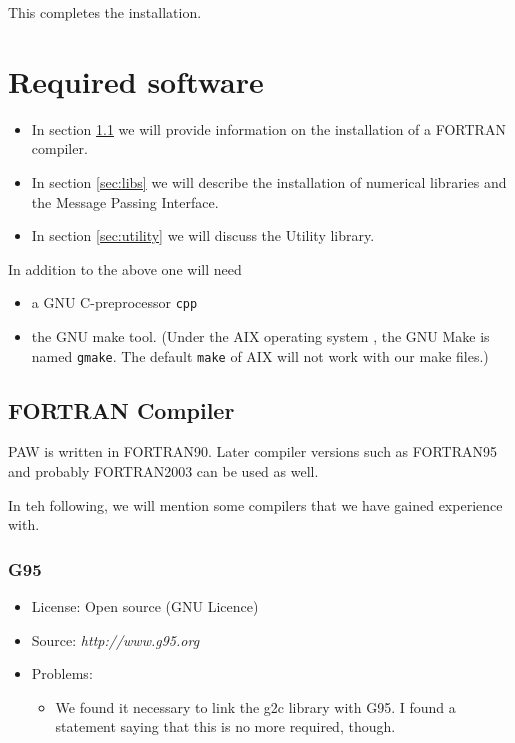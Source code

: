 \documentclass[a4paper,10pt]{report}
\newcommand{\mytt}[1]{{\tt #1}}
\begin{document}
This completes the installation.



\chapter{Required software}
\label{sec:software}
\begin{itemize}
\item In section \ref{sec:compiler} we will provide information on the
installation of a FORTRAN compiler.
\item In section \ref{sec:libs} we will describe the installation of
numerical libraries and the Message Passing Interface.
\item  In section \ref{sec:utility} we will discuss the Utility library.
\end{itemize}

\noindent In addition to the above one will need
\begin{itemize}
\item a GNU C-preprocessor \mytt{cpp}
\item the GNU make tool. (Under the AIX operating system , the GNU
Make is named \mytt{gmake}. The default \mytt{make} of AIX will not
work with our make files.)
\end{itemize}

\section{FORTRAN Compiler}
\label{sec:compiler}
PAW is written in FORTRAN90. Later compiler versions such as FORTRAN95
and probably FORTRAN2003 can be used as well. 

In teh following, we will mention some compilers that we have gained
experience with.
 
\subsection{G95}
\label{sec:g95}
\begin{itemize}
\item License: Open source (GNU Licence)
\item Source: \textit{http://www.g95.org}
\item Problems: 
\begin{itemize}
\item We found it necessary to link the g2c library with G95. I found
a statement saying that this is no more required, though.
\end{itemize}
\end{itemize}
\end{document}
